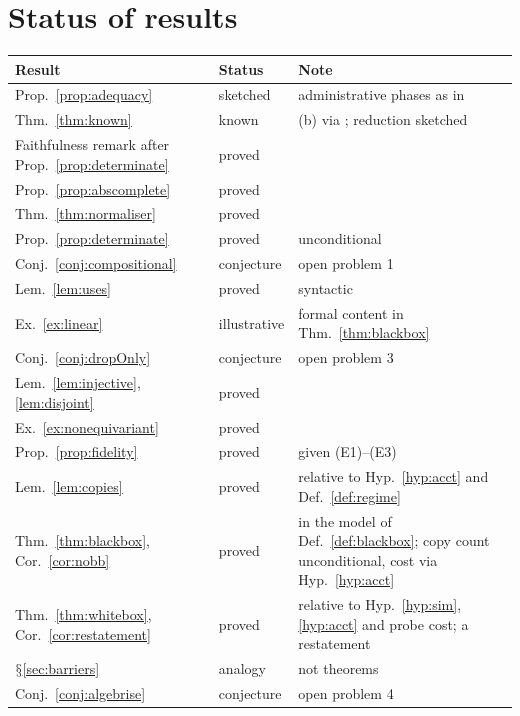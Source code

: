 \documentclass[11pt]{article}
\theoremstyle{definition}
\theoremstyle{plain}
\theoremstyle{remark}
\DeclareRobustCommand{\S}{\ifmmode\mathsection\else$\mathsection$\fi}
\begin{document}
\appendix

\section{Status of results}\label{app:status}

\begin{center}
\begin{tabular}{@{}llp{}@{}}
\toprule
Result & Status & Note \\
\midrule
Prop.~\ref{prop:adequacy} & sketched & administrative phases as in \cite{NWNS} \\
Thm.~\ref{thm:known} & known & (b) via \cite{StockmeyerMeyer73}; reduction sketched \\
Faithfulness remark after Prop.~\ref{prop:determinate} & proved & \\
Prop.~\ref{prop:abscomplete} & proved & \\
Thm.~\ref{thm:normaliser} & proved & \\
Prop.~\ref{prop:determinate} & proved & unconditional \\
Conj.~\ref{conj:compositional} & conjecture & open problem 1 \\
Lem.~\ref{lem:uses} & proved & syntactic \\
Ex.~\ref{ex:linear} & illustrative & formal content in Thm.~\ref{thm:blackbox} \\
Conj.~\ref{conj:dropOnly} & conjecture & open problem 3 \\
Lem.~\ref{lem:injective}, \ref{lem:disjoint} & proved & \\
Ex.~\ref{ex:nonequivariant} & proved & \\
Prop.~\ref{prop:fidelity} & proved & given (E1)--(E3) \\
Lem.~\ref{lem:copies} & proved & relative to Hyp.~\ref{hyp:acct} and Def.~\ref{def:regime} \\
Thm.~\ref{thm:blackbox}, Cor.~\ref{cor:nobb} & proved & in the model of Def.~\ref{def:blackbox}; copy count unconditional, cost via Hyp.~\ref{hyp:acct} \\
Thm.~\ref{thm:whitebox}, Cor.~\ref{cor:restatement} & proved & relative to Hyp.~\ref{hyp:sim}, \ref{hyp:acct} and probe cost; a restatement \\
\S\ref{sec:barriers} & analogy & not theorems \\
Conj.~\ref{conj:algebrise} & conjecture & open problem 4 \\
\bottomrule
\end{tabular}
\end{center}
\end{document}

